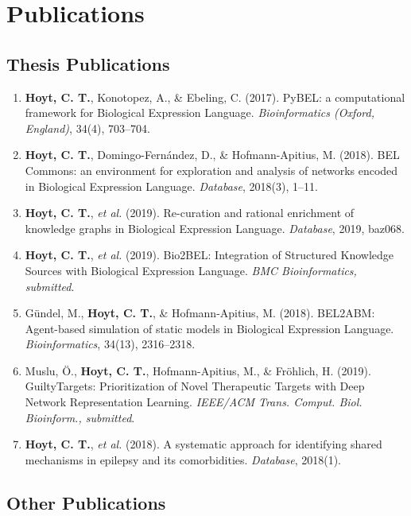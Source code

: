 \chapter*{Publications}

\section*{Thesis Publications}

\begin{enumerate}
    \item \textbf{Hoyt, C. T.}, Konotopez, A., \& Ebeling, C. (2017). PyBEL: a computational framework for Biological Expression Language. \textit{Bioinformatics (Oxford, England)}, 34(4), 703–704.
    \item \textbf{Hoyt, C. T.}, Domingo-Fern\'{a}ndez, D., \& Hofmann-Apitius, M. (2018). BEL Commons: an environment for exploration and analysis of networks encoded in Biological Expression Language. \textit{Database}, 2018(3), 1–11.
    \item \textbf{Hoyt, C. T.}, \textit{et al.} (2019). Re-curation and rational enrichment of knowledge graphs in Biological Expression Language. \textit{Database}, 2019, baz068.
    \item \textbf{Hoyt, C. T.}, \textit{et al.} (2019). Bio2BEL: Integration of Structured Knowledge Sources with Biological Expression Language. \textit{BMC Bioinformatics, submitted}.
    \item Gündel, M., \textbf{Hoyt, C. T.}, \& Hofmann-Apitius, M. (2018). BEL2ABM: Agent-based simulation of static models in Biological Expression Language. \textit{Bioinformatics}, 34(13), 2316–2318.
    \item Muslu, Ö., \textbf{Hoyt, C. T.}, Hofmann-Apitius, M., \& Fröhlich, H. (2019). GuiltyTargets: Prioritization of Novel Therapeutic Targets with Deep Network Representation Learning. \textit{IEEE/ACM Trans. Comput. Biol. Bioinform., submitted}.
    \item \textbf{Hoyt, C. T.}, \textit{et al.} (2018). A systematic approach for identifying shared mechanisms in epilepsy and its comorbidities. \textit{Database}, 2018(1).
\end{enumerate}

\section*{Other Publications}


